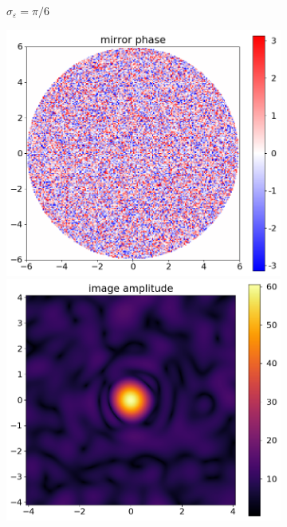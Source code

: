 \documentclass{article}
\newcommand{\eps}{\varepsilon}
\begin{document}
\begin{figure}
\begin{subfigure}{0.5\textwidth}
\begin{minipage}{0.5\textwidth}
        \end{minipage}
        \caption{$\sigma_{\eps} = \pi/6$}\label{fig:randpic:1}
    \end{subfigure}%
    \hfill
    \begin{subfigure}{0.5\textwidth}
        \begin{minipage}{0.5\textwidth}
            \centering
            \includegraphics[width=\textwidth]{pictures/error_pics/errors1in_phase.png}
        \end{minipage}%
        \hfill
        \begin{minipage}{0.5\textwidth}
            \centering
            \includegraphics[width=\textwidth]{pictures/error_pics/errors1out_abs.png}

\end{minipage}
\end{subfigure}
\end{figure}
\end{document}
